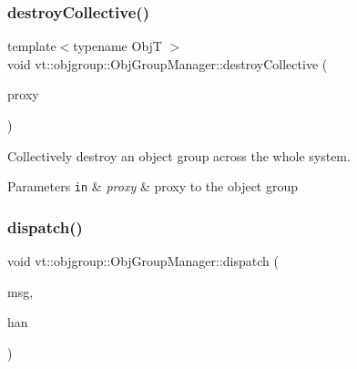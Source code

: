 \subsubsection{\texorpdfstring{destroy\+Collective()}{destroyCollective()}}
{\footnotesize\ttfamily template$<$typename ObjT $>$ \\
void vt\+::objgroup\+::\+Obj\+Group\+Manager\+::destroy\+Collective (\begin{DoxyParamCaption}\item[{\hyperlink{structvt_1_1objgroup_1_1_obj_group_manager_aea65eef52f240a52210132eef5ce591f}{Proxy\+Type}$<$ ObjT $>$}]{proxy }\end{DoxyParamCaption})}



Collectively destroy an object group across the whole system. 


\begin{DoxyParams}[1]{Parameters}
\mbox{\tt in}  & {\em proxy} & proxy to the object group \\
\hline
\end{DoxyParams}
\mbox{\label{structvt_1_1objgroup_1_1_obj_group_manager_ad3e01d20b90d5447445538541025aa4b}} 
\subsubsection{\texorpdfstring{dispatch()}{dispatch()}}
{\footnotesize\ttfamily void vt\+::objgroup\+::\+Obj\+Group\+Manager\+::dispatch (\begin{DoxyParamCaption}\item[{\hyperlink{namespacevt_ab2b3d506ec8e8d1540aede826d84a239}{Msg\+Shared\+Ptr}$<$ \hyperlink{namespacevt_a1125ac1da6c0bbf141e0ea0739d7602d}{Short\+Message} $>$}]{msg,  }\item[{\hyperlink{namespacevt_af64846b57dfcaf104da3ef6967917573}{Handler\+Type}}]{han }\end{DoxyParamCaption})}

\mbox{\label{structvt_1_1objgroup_1_1_obj_group_manager_ab7ea99ad2668a99debd687a20bb9e3dd}} 
